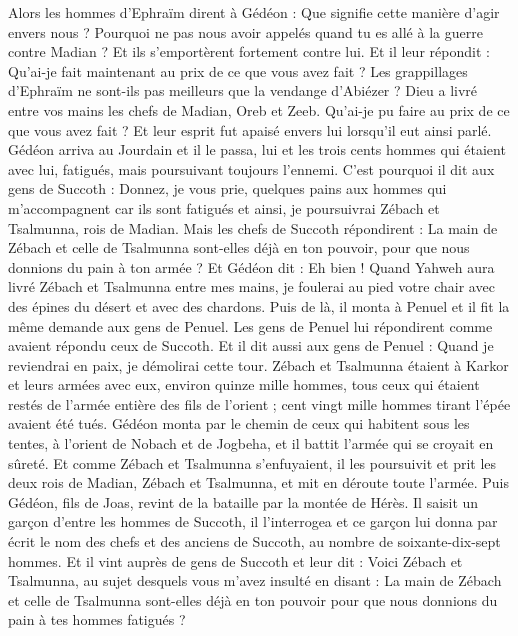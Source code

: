 \begin{multicols}{2}
\VerseOne{}Alors les hommes d'Ephraïm dirent à Gédéon : Que signifie cette manière d'agir envers nous ? Pourquoi ne pas nous avoir appelés quand tu es allé à la guerre contre Madian ? Et ils s'emportèrent fortement contre lui.
Et il leur répondit : Qu'ai-je fait maintenant au prix de ce que vous avez fait ? Les grappillages d'Ephraïm ne sont-ils pas meilleurs que la vendange d'Abiézer ?
Dieu a livré entre vos mains les chefs de Madian, Oreb et Zeeb. Qu'ai-je pu faire au prix de ce que vous avez fait ? Et leur esprit fut apaisé envers lui lorsqu'il eut ainsi parlé.
Gédéon arriva au Jourdain et il le passa, lui et les trois cents hommes qui étaient avec lui, fatigués, mais poursuivant toujours l'ennemi.
C'est pourquoi il dit aux gens de Succoth : Donnez, je vous prie, quelques pains aux hommes qui m'accompagnent car ils sont fatigués et ainsi, je poursuivrai Zébach et Tsalmunna, rois de Madian.
Mais les chefs de Succoth répondirent : La main de Zébach et celle de Tsalmunna sont-elles déjà en ton pouvoir, pour que nous donnions du pain à ton armée ?
Et Gédéon dit : Eh bien ! Quand Yahweh aura livré Zébach et Tsalmunna entre mes mains, je foulerai au pied votre chair avec des épines du désert et avec des chardons.
Puis de là, il monta à Penuel et il fit la même demande aux gens de Penuel. Les gens de Penuel lui répondirent comme avaient répondu ceux de Succoth.
Et il dit aussi aux gens de Penuel : Quand je reviendrai en paix, je démolirai cette tour.
Zébach et Tsalmunna étaient à Karkor et leurs armées avec eux, environ quinze mille hommes, tous ceux qui étaient restés de l'armée entière des fils de l'orient ; cent vingt mille hommes tirant l'épée avaient été tués.
Gédéon monta par le chemin de ceux qui habitent sous les tentes, à l'orient de Nobach et de Jogbeha, et il battit l'armée qui se croyait en sûreté.
Et comme Zébach et Tsalmunna s'enfuyaient, il les poursuivit et prit les deux rois de Madian, Zébach et Tsalmunna, et mit en déroute toute l'armée.
Puis Gédéon, fils de Joas, revint de la bataille par la montée de Hérès.
Il saisit un garçon d'entre les hommes de Succoth, il l'interrogea et ce garçon lui donna par écrit le nom des chefs et des anciens de Succoth, au nombre de soixante-dix-sept hommes.
Et il vint auprès de gens de Succoth et leur dit : Voici Zébach et Tsalmunna, au sujet desquels vous m'avez insulté en disant : La main de Zébach et celle de Tsalmunna sont-elles déjà en ton pouvoir pour que nous donnions du pain à tes hommes fatigués ?

\end{multicols}
